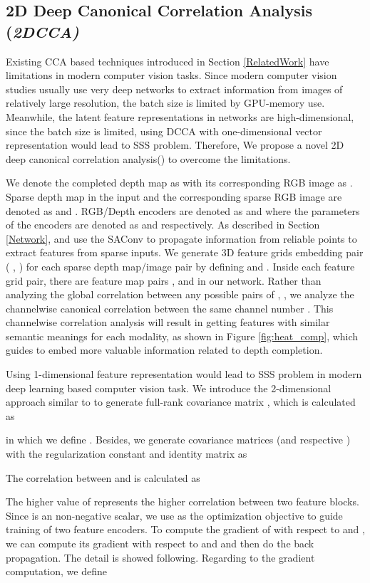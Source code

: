 \documentclass{article}
\begin{document}
\subsection{2D Deep Canonical Correlation Analysis (\textit{2DCCA)}}
\label{2D2CCA}
Existing CCA based techniques introduced in Section \ref{RelatedWork} have limitations in modern computer vision tasks. Since modern computer vision studies usually use very deep networks to extract information from images of relatively large resolution, the batch size is limited by GPU-memory use. Meanwhile, the latent feature representations in networks are high-dimensional, since the batch size is limited, using DCCA with one-dimensional vector representation would lead to SSS problem. Therefore, We propose a novel 2D deep canonical correlation analysis() to overcome the limitations.

We denote the completed depth map as  with its corresponding RGB image as . Sparse depth map in the input and the corresponding sparse RGB image are denoted as  and . RGB/Depth encoders are denoted as  and  where the parameters of the encoders are denoted as  and  respectively. As described in Section \ref{Network},  and  use the SAConv to propagate information from reliable points to extract features from sparse inputs. We generate 3D feature grids embedding pair ( , ) for each sparse depth map/image pair  by defining  and . Inside each feature grid pair, there are  feature map pairs , and  in our network. Rather than analyzing the global correlation between any possible pairs of , , we analyze the channelwise canonical correlation between the same channel number . This channelwise correlation analysis will result in getting features with similar semantic meanings for each modality, as shown in Figure \ref{fig:heat_comp}, which guides  to embed more valuable information related to depth completion.

Using 1-dimensional feature representation would lead to SSS problem in modern deep learning based computer vision task. We introduce the 2-dimensional approach similar to \cite{yang2004two} to generate full-rank covariance matrix , which is calculated as

in which we define . Besides, we generate covariance matrices  (and respective ) with the regularization constant  and identity matrix  as

The correlation between  and  is calculated as


The higher value of  represents the higher correlation between two feature blocks. Since  is an non-negative scalar, we use  as the optimization objective to guide training of two feature encoders. 
To compute the gradient of  with
respect to  and , we can compute its gradient with respect to  and  and then do the back propagation. The detail is showed following. Regarding to the gradient computation, we define
\end{document}
